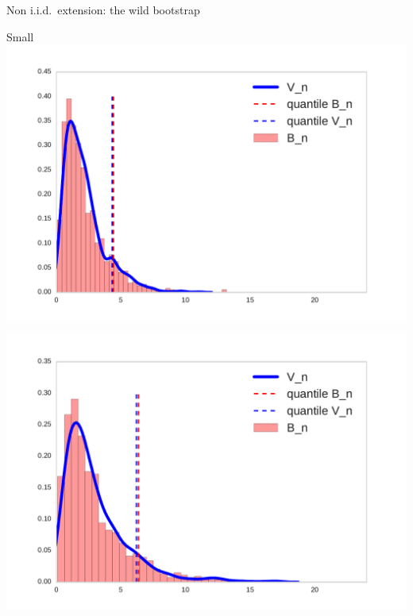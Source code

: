 \begin{frame}
\begin{columns}
\begin{column}{.33\linewidth}
\begin{block}{Non i.i.d.\ extension: the wild bootstrap}
\begin{center}
  \begin{minipage}{.49\linewidth}
  Small 
 \includegraphics[width=\textwidth]{../../presentation/img/bootstrapWorks1.pdf}
  \end{minipage}
\begin{minipage}{.49\linewidth}
 \begin{minipage}{.49\linewidth}
 \includegraphics[width=\textwidth]{../../presentation/img/bootstrapWorks4.pdf}
  \end{minipage}
\end{minipage}




\end{center}
\end{block}
\end{column}
\end{columns}
\end{frame}
